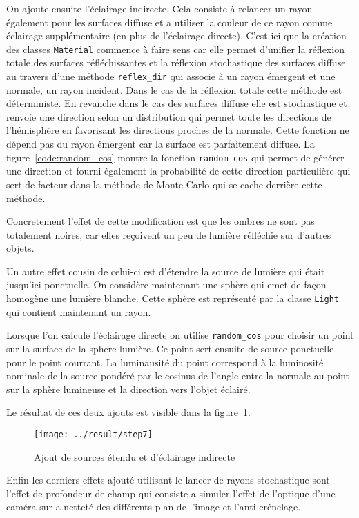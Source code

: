 \documentclass[12pt]{article}
\newcommand\id[1]{\texttt{#1}}
\begin{document}
On ajoute ensuite l'éclairage indirecte.
Cela consiste à relancer un rayon également pour les surfaces diffuse et a utiliser la couleur de ce rayon comme éclairage supplémentaire (en plus de l'éclairage directe).
C'est ici que la création des classes \id{Material} commence à faire sens car elle permet d'unifier la réflexion totale des surfaces réfléchissantes et la réflexion stochastique des surfaces diffuse au travers d'une méthode \id{reflex\_dir} qui associe à un rayon émergent et une normale, un rayon incident.
Dans le cas de la réflexion totale cette méthode est déterministe.
En revanche dans le cas des surfaces diffuse elle est stochastique et renvoie une direction selon un distribution qui permet toute les directions de l'hémisphère en favorisant les directions proches de la normale.
Cette fonction ne dépend pas du rayon émergent car la surface est parfaitement diffuse.
La figure~\ref{code:random_cos} montre la fonction \id{random\_cos} qui permet de générer une direction et fourni également la probabilité de cette direction particulière qui sert de facteur dans la méthode de Monte-Carlo qui se cache derrière cette méthode.

Concretement l'effet de cette modification est que les ombres ne sont pas totalement noires, car elles reçoivent un peu de lumière réfléchie sur d'autres objets.

Un autre effet cousin de celui-ci est d'étendre la source de lumière qui était jusqu'ici ponctuelle.
On considère maintenant une sphère qui emet de façon homogène une lumière blanche.
Cette sphère est représenté par la classe \id{Light} qui contient maintenant un rayon.

Lorsque l'on calcule l'éclairage directe on utilise \id{random\_cos} pour choisir un point sur la surface de la sphere lumière. Ce point sert ensuite de source ponctuelle pour le point courrant.
La luminausité du point correspond à la luminosité nominale de la source pondéré par le cosinus de l'angle entre la normale au point sur la sphère lumineuse et la direction vers l'objet éclairé.

Le résultat de ces deux ajouts est visible dans la figure~\ref{fig:step7}.

\begin{figure}[ht]
  \centering
  \texttt{[image: ../result/step7]}
  \caption{Ajout de sources étendu et d'éclairage indirecte}\label{fig:step7}
\end{figure}

Enfin les derniers effets ajouté utilisant le lancer de rayons stochastique sont l'effet de profondeur de champ qui consiste a simuler l'effet de l'optique d'une caméra sur a netteté des différents plan de l'image et l'anti-crénelage.
\end{document}

